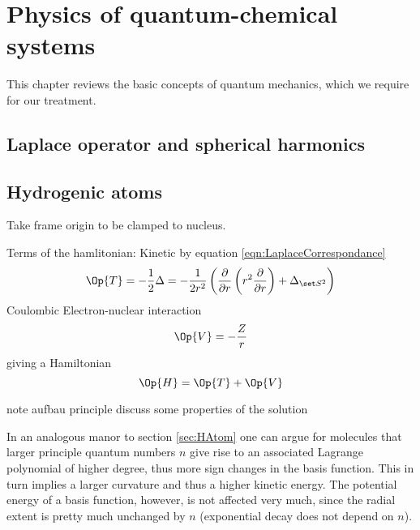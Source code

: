 \chapter{Physics of quantum-chemical systems}

This chapter reviews the basic concepts of quantum mechanics,
which we require for our treatment.


\section{Laplace operator and spherical harmonics}


\section{Hydrogenic atoms}
\label{sec:HAtom}

Take frame origin to be clamped to nucleus.


Terms of the hamlitonian:
Kinetic by equation \eqref{eqn:LaplaceCorrespondance}
\[ \Op{T} = - \frac12 \Delta = -\frac{1}{2r^2} \left( \laplaceRadial + \laplaceSphere  \right)   \]
Coulombic Electron-nuclear interaction
\[ \Op{V} = - \frac{Z}{r} \]
giving a Hamiltonian
\[ \Op{H} = \Op{T} + \Op{V} \]



note aufbau principle
discuss some properties of the solution


In an analogous manor to section \vref{sec:HAtom}
one can argue for molecules that larger principle quantum numbers
$n$ give rise to an associated Lagrange polynomial of higher degree,
thus more sign changes in the basis function.
This in turn implies a larger curvature and thus a higher kinetic energy.
The potential energy of a basis function, however,
is not affected very much,
since the radial extent is pretty much unchanged by $n$
(exponential decay does not depend on $n$).

